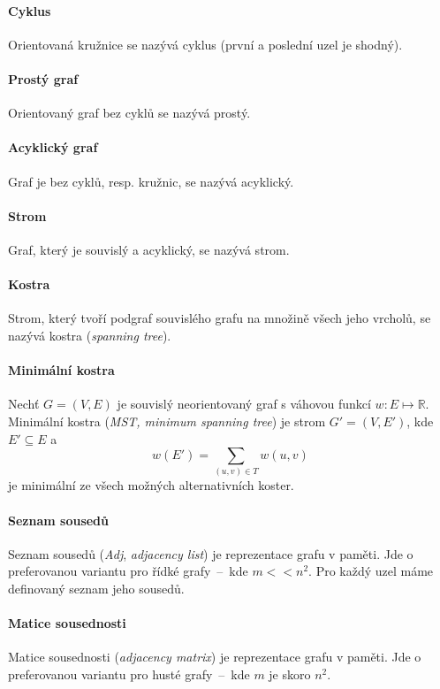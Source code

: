 \paragraph*{Cyklus} Orientovaná kružnice se nazývá cyklus (první a poslední uzel je shodný).

\paragraph*{Prostý graf} Orientovaný graf bez cyklů se nazývá prostý.

\paragraph*{Acyklický graf} Graf je bez cyklů, resp. kružnic, se nazývá acyklický.

\paragraph*{Strom} Graf, který je souvislý a acyklický, se nazývá strom.

\paragraph*{Kostra} Strom, který tvoří podgraf souvislého grafu na množině všech jeho vrcholů, se nazývá kostra (\textit{spanning tree}).

\paragraph*{Minimální kostra} Nechť $G = (V, E)$ je souvislý neorientovaný graf s váhovou funkcí $w : E \mapsto \mathbb{R}$. Minimální kostra (\textit{MST, minimum spanning tree}) je strom $G' = (V, E')$, kde $E' \subseteq E$ a $$w(E') = \sum_{(u,v) \in T} w(u, v)$$ je minimální ze všech možných alternativních koster.

\paragraph*{Seznam sousedů} Seznam sousedů (\textit{Adj}, \textit{adjacency list}) je reprezentace grafu v paměti. Jde o preferovanou variantu pro řídké grafy~--~kde $m << n^2$. Pro každý uzel máme definovaný seznam jeho sousedů.

\paragraph*{Matice sousednosti} Matice sousednosti (\textit{adjacency matrix}) je reprezentace grafu v paměti. Jde o preferovanou variantu pro husté grafy~--~kde $m$ je skoro $n^2$.

